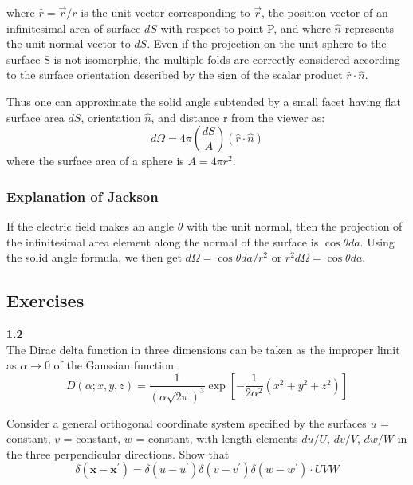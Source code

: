 where $\hat{r} = \vec{r}/r$ is the unit vector corresponding to $\vec {r}$,
the position vector of an infinitesimal area of surface $dS$ with respect to point P,
and where $\hat{n}$ represents the unit normal vector to $dS$.
Even if the projection on the unit sphere to the surface S is not isomorphic,
the multiple folds are correctly considered according to the surface orientation
described by the sign of the scalar product $\hat{r}\cdot\hat{n}$.

Thus one can approximate the solid angle subtended by a small facet having flat surface area
$dS$, orientation $\hat{n}$, and distance r from the viewer as:
$$
d\Omega = 4\pi \left( \frac{dS}{A} \right) (\hat{r}\cdot\hat{n})
$$
where the surface area of a sphere is $A = 4\pi r^2$.


\subsubsection{Explanation of Jackson}

If the electric field makes an angle $\theta$ with the unit normal, then the projection of the
infinitesimal area element along the normal of the surface is $\cos\theta da$.
Using the solid angle formula, we then get $d\Omega = \cos\theta da / r^2$ or
$r^2 d\Omega = \cos\theta da$.



\subsection{Exercises}

\textbf{1.2}
\\

The Dirac delta function in three dimensions can be taken as the improper limit as $\alpha \rightarrow 0$ of the
Gaussian function
$$
D\left(\alpha ; x, y, z \right) =
    \frac{1}{\left(\alpha \sqrt{2\pi}\right)^3}
    \exp{ \left[ -\frac{1}{2\alpha^2} \left( x^2 + y^2 + z^2 \right) \right] }
$$

Consider a general orthogonal coordinate system specified by the surfaces $u$ = constant, $v$ = constant,
$w$ = constant, with length elements $du/U$, $dv/V$, $dw/W$ in the three perpendicular directions.
Show that
$$
\delta\left( \mathbf{x} - \mathbf{x}^\prime \right) =
    \delta\left(u - u^\prime\right) \delta\left(v - v^\prime\right) \delta\left(w - w^\prime\right) \cdot UVW
$$

